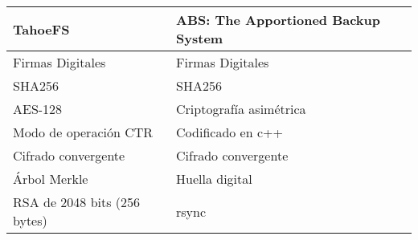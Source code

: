 



\begin{tabular}{ |p{8cm}|p{8cm}| }
\hline
{ \textbf{TahoeFS}}  & {\textbf{ABS: The Apportioned Backup System} } \\
\hline
{Firmas Digitales}  & {Firmas Digitales} \\
\hline
{SHA256}  & {SHA256}  \\
\hline
{AES-128}  & {Criptografía asimétrica}  \\
\hline
{Modo de operación CTR }  & {Codificado en c++} \\
\hline
{Cifrado convergente}  & {Cifrado convergente}  \\
\hline
{Árbol Merkle}  & {Huella digital} \\
\hline
{RSA de 2048 bits (256 bytes) }  & { rsync  } \\
\hline
\end{tabular}
\\
